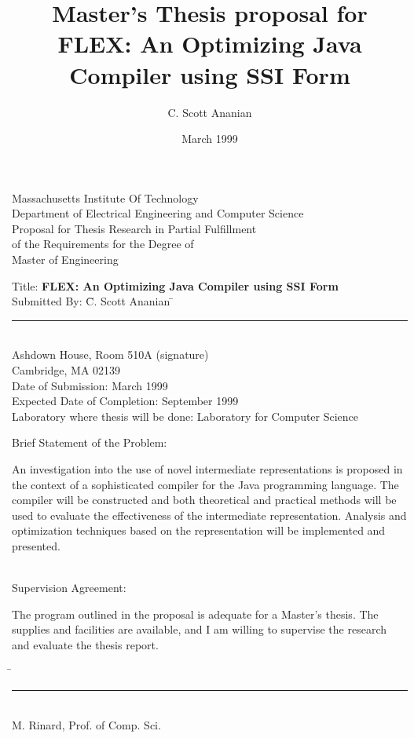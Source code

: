\documentclass[12pt,twoside]{article}
\title{{\large Master's Thesis proposal for}\\
FLEX: An Optimizing Java Compiler using SSI Form}
\author{C. Scott Ananian}
\date{March 1999\\\vspace{5pt}}
\begin{document}
\begin{titlepage}
\newcommand{\nl}{\\[0.5\baselineskip]}
\begin{centering}\large
Massachusetts Institute Of Technology\\
Department of Electrical Engineering and Computer Science\\
\vspace{0.5cm}
Proposal for Thesis Research in Partial Fulfillment\\
of the Requirements for the Degree of\\
Master of Engineering\\
\end{centering}
\vspace{0.25cm}
\begin{tabbing}
Title: \textbf{FLEX: An Optimizing Java Compiler using SSI Form}\nl
Submitted By: \= C. Scott Ananian \hspace{3cm}\=\rule{6cm}{0.5pt}\\
              \> Ashdown House, Room 510A     \>(signature)\\
              \> Cambridge, MA 02139\nl
Date of Submission: March 1999\nl
Expected Date of Completion: September 1999\nl
Laboratory where thesis will be done: Laboratory for Computer
Science%
\end{tabbing}
Brief Statement of the Problem:

An investigation into the use of novel intermediate representations is
proposed in the context of a sophisticated compiler for the Java
programming language.  The compiler will be constructed and both
theoretical and practical methods will be used to evaluate the
effectiveness of the intermediate representation.  Analysis and
optimization techniques based on the representation will be
implemented and presented.

~\\Supervision Agreement:

The program outlined in the proposal is adequate for a Master's
thesis.  The supplies and facilities are available, and I am willing
to supervise the research and evaluate the thesis report.

\begin{tabbing}
\hspace{3.5in}\=\kill
\>\rule{2.5in}{0.5pt}\\
\>M. Rinard, Prof. of Comp. Sci.\\
\end{tabbing}

\end{titlepage}
\end{document}
